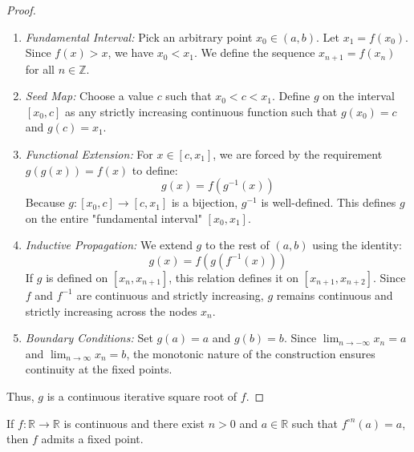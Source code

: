 \begin{solution}
\begin{proof}
        \begin{enumerate}
            \item \textit{Fundamental Interval:} Pick an arbitrary point \( x_0 \in \left(a, b\right) \). Let \( x_1 = f\left(x_0\right) \). Since \( f\left(x\right) > x \), we have \( x_0 < x_1 \). We define the sequence \( x_{n+1} = f\left(x_n\right) \) for all \( n \in \mathbb{Z} \).

            \item \textit{Seed Map:} Choose a value \( c \) such that \( x_0 < c < x_1 \). Define \( g \) on the interval \( \left[x_0, c\right] \) as any strictly increasing continuous function such that \( g\left(x_0\right) = c \) and \( g\left(c\right) = x_1 \).

            \item \textit{Functional Extension:} For \( x \in \left[c, x_1\right] \), we are forced by the requirement \( g\left(g\left(x\right)\right) = f\left(x\right) \) to define:
                \[
                    g\left(x\right) = f\left(g^{-1}\left(x\right)\right)
                \]
                Because \( g: \left[x_0, c\right] \to \left[c, x_1\right] \) is a bijection, \( g^{-1} \) is well-defined. This defines \( g \) on the entire "fundamental interval" \( \left[x_0, x_1\right] \).

            \item \textit{Inductive Propagation:} We extend \( g \) to the rest of \( \left(a, b\right) \) using the identity:
                \[
                    g\left(x\right) = f\left(g\left(f^{-1}\left(x\right)\right)\right)
                \]
                If \( g \) is defined on \( \left[x_n, x_{n+1}\right] \), this relation defines it on \( \left[x_{n+1}, x_{n+2}\right] \). Since \( f \) and \( f^{-1} \) are continuous and strictly increasing, \( g \) remains continuous and strictly increasing across the nodes \( x_n \).

            \item \textit{Boundary Conditions:} Set \( g\left(a\right) = a \) and \( g\left(b\right) = b \). Since \( \lim_{n \to -\infty} x_n = a \) and \( \lim_{n \to \infty} x_n = b \), the monotonic nature of the construction ensures continuity at the fixed points.
        \end{enumerate}
        Thus, \( g \) is a continuous iterative square root of \( f \).
    \end{proof}
    \begin{lemma}
        If \( f: \mathbb{R} \to \mathbb{R} \) is continuous and there exist \( n > 0 \) and \( a \in \mathbb{R} \) such that \( f^{\circ n}\left(a\right) = a \), then \( f \) admits a fixed point.
    \end{lemma}


\end{solution}
